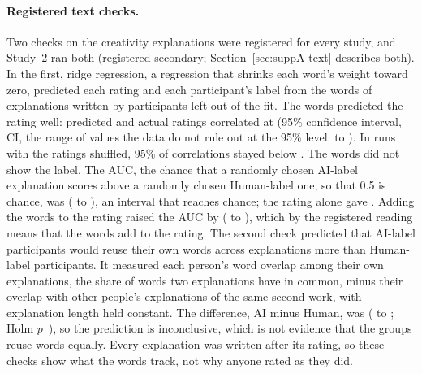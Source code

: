 \paragraph*{Registered text checks.}
Two checks on the creativity explanations were registered for every study, and Study~2 ran both (registered secondary; Section~\ref{sec:suppA-text} describes both). In the first, ridge regression, a regression that shrinks each word's weight toward zero, predicted each rating and each participant's label from the words of explanations written by participants left out of the fit. The words predicted the rating well: predicted and actual ratings correlated at \STwoTextRecRatingCreat{} (95\% confidence interval, CI, the range of values the data do not rule out at the 95\% level: \STwoTextRecRatingCreatLo{} to \STwoTextRecRatingCreatHi). In runs with the ratings shuffled, 95\% of correlations stayed below \STwoTextRecRatingCreatNull. The words did not show the label. The AUC, the chance that a randomly chosen AI-label explanation scores above a randomly chosen Human-label one, so that 0.5 is chance, was \STwoTextRecArmCreat{} (\STwoTextRecArmCreatLo{} to \STwoTextRecArmCreatHi), an interval that reaches chance; the rating alone gave \STwoTextRecArmFromRatingCreat. Adding the words to the rating raised the AUC by \STwoTextRecIncrCreat{} (\STwoTextRecIncrCreatLo{} to \STwoTextRecIncrCreatHi), which by the registered reading means that the words add to the rating. The second check predicted that AI-label participants would reuse their own words across explanations more than Human-label participants. It measured each person's word overlap among their own explanations, the share of words two explanations have in common, minus their overlap with other people's explanations of the same second work, with explanation length held constant. The difference, AI minus Human, was \STwoTextOverlapCreatDiff{} (\STwoTextOverlapCreatLo{} to \STwoTextOverlapCreatHi; Holm $p$~\STwoTextOverlapCreatPHolm), so the prediction is inconclusive, which is not evidence that the groups reuse words equally. Every explanation was written after its rating, so these checks show what the words track, not why anyone rated as they did.

